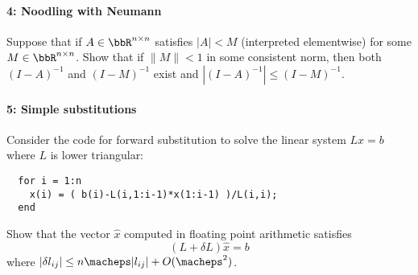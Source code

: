 \documentclass[12pt, leqno]{article} %
\begin{document}
\paragraph*{4: Noodling with Neumann}
Suppose that if $A \in \bbR^{n \times n}$ satisfies
$|A| < M$ (interpreted elementwise) for some $M \in \bbR^{n \times n}$.
Show that if $\|M\| < 1$ in some consistent norm, then
both $(I-A)^{-1}$ and $(I-M)^{-1}$ exist and
$|(I-A)^{-1}| \leq (I-M)^{-1}$.

\paragraph*{5: Simple substitutions}
Consider the code for forward substitution to solve the linear system
$Lx = b$ where $L$ is lower triangular:
\begin{lstlisting}
  for i = 1:n
    x(i) = ( b(i)-L(i,1:i-1)*x(1:i-1) )/L(i,i);
  end
\end{lstlisting}
Show that the vector $\hat{x}$ computed in floating point arithmetic
satisfies
\[
  (L+\delta L) \hat{x} = b
\]
where $|\delta l_{ij}| \leq n \macheps |l_{ij}| + O(\macheps^2)$.
\end{document}
